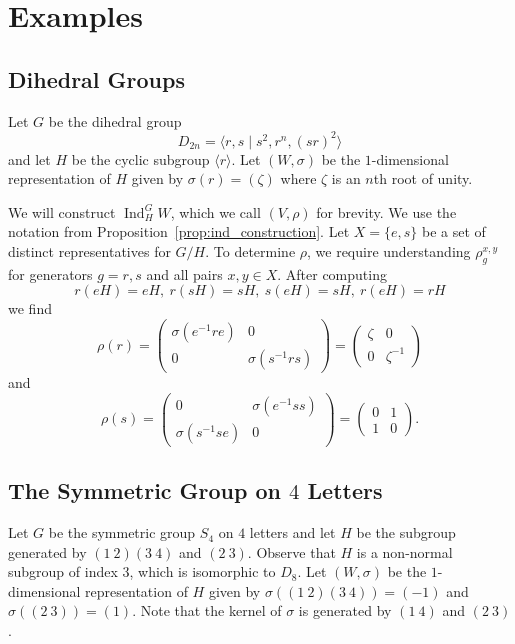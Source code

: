 \documentclass[12pt]{article}
\theoremstyle{plain}
\theoremstyle{definition}
\theoremstyle{remark}
\numberwithin{equation}{section}
\begin{document}
\section{Examples}

\subsection{Dihedral Groups}

Let $G$ be the dihedral group
\[
D_{2n} = \langle r,s \mid s^2, r^n, (sr)^2 \rangle
\]
and let $H$ be the cyclic subgroup $\langle r \rangle$.
Let $(W,\sigma)$ be the $1$-dimensional representation of $H$
given by $\sigma(r)=(\zeta)$ where $\zeta$ is an $n$th root of unity.

We will construct $\operatorname{Ind}^G_H W$, which we call $(V,\rho)$
for brevity.
We use the notation from Proposition~\ref{prop:ind_construction}.
Let $X = \{e, s \}$ be a set of distinct representatives for $G/H$.
To determine $\rho$, we require understanding $\rho_g^{x,y}$
for generators $g=r,s$ and all pairs $x,y \in X$.
After computing
\[
r(eH)=eH,\ r(sH)=sH,\ s(eH)=sH,\ r(eH)=rH 
\]
we find
\[
\rho(r)=
\begin{pmatrix} \sigma(e^{-1}re) & 0 \\ 0 & \sigma(s^{-1}rs) \end{pmatrix}
=\begin{pmatrix} \zeta & 0 \\ 0 & \zeta^{-1} \end{pmatrix}
\]
and
\[
\rho(s)=
\begin{pmatrix} 0 & \sigma(e^{-1}ss) \\ \sigma(s^{-1}se) & 0 \end{pmatrix}
=\begin{pmatrix} 0 & 1 \\ 1 & 0 \end{pmatrix}.
\]

\subsection{The Symmetric Group on $4$ Letters}

Let $G$ be the symmetric group $S_4$ on $4$ letters
and let $H$ be the subgroup generated by $(1\ 2)(3\ 4)$
and $(2\ 3)$.
Observe that $H$ is a non-normal subgroup of index $3$,
which is isomorphic to $D_8$.
Let $(W,\sigma)$ be the $1$-dimensional representation of $H$
given by $\sigma((1\ 2)(3\ 4))=(-1)$ and $\sigma((2\ 3))=(1)$.
Note that the kernel of $\sigma$ is generated by $(1\ 4)$ and $(2\ 3)$.
\end{document}
